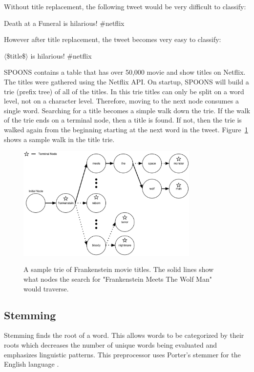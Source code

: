 \documentclass[12pt]{ucthesis}
\newcommand{\captionfonts}{\small\bf\ssp}
\begin{document}
Without title replacement, the following tweet would be very difficult to classify:

\begin{center}
Death at a Funeral is hilarious!  \#netflix
\end{center}

However after title replacement, the tweet becomes very easy to classify:

\begin{center}
$\langle$\$title\$$\rangle$ is hilarious!  \#netflix
\end{center}

SPOONS contains a table that has over 50,000 movie and show titles on Netflix. The titles were gathered
using the Netflix API. On startup, SPOONS will build a trie (prefix tree)\cite{trie} of all of the titles. In this trie titles can
only be split on a word level, not on a character level. Therefore, moving to the next node consumes a single word.
Searching for a title becomes a simple walk down the trie.
If the walk of the trie ends on a terminal node, then a title is found. If not, then the trie is walked again from the beginning
starting at the next word in the tweet. Figure~\ref{fig:title-trie} shows a sample walk in the title trie.

\begin{figure}
   \begin{center}
      \includegraphics[width=0.8\textwidth]{images/Title_Trie.eps}
      \captionfonts
      \caption[Title Trie Walk]{A sample trie of Frankenstein movie titles. The solid lines show what nodes the search for "Frankenstein Meets The Wolf Man" would traverse.}
      \label{fig:title-trie}
   \end{center}
\end{figure}

\subsection{Stemming}
\label{class-filter-stemming}
Stemming finds the root of a word. This allows words to be categorized by their roots which
decreases the number of unique words being evaluated and emphasizes linguistic patterns.
This preprocessor uses Porter's stemmer for the English language \cite{porters}.
\end{document}
